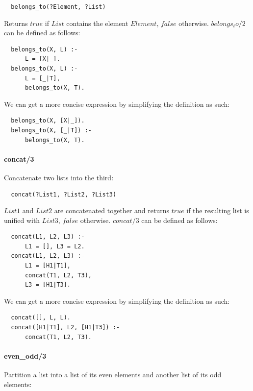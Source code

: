\documentclass{article}
\begin{document}
\begin{multicols}{2}
  \begin{lstlisting}
  belongs_to(?Element, ?List)
  \end{lstlisting} 
  
  Returns $true$ if $List$ contains the element $Element$, $false$ otherwise. $belongs_to/2$ can be defined as follows:

  \begin{lstlisting}
  belongs_to(X, L) :-
      L = [X|_].
  belongs_to(X, L) :-
      L = [_|T],
      belongs_to(X, T).
  \end{lstlisting} 
  
  We can get a more concise expression by simplifying the definition as such:

  \begin{lstlisting}
  belongs_to(X, [X|_]).
  belongs_to(X, [_|T]) :-
      belongs_to(X, T).
  \end{lstlisting} 
  
  \paragraph{concat/3} Concatenate two lists into the third:
  
  \begin{lstlisting}
  concat(?List1, ?List2, ?List3)
  \end{lstlisting} 
  
  $List1$ and $List2$ are concatenated together and returns $true$ if the resulting list is unified with $List3$, $false$ otherwise. $concat/3$ can be defined as follows:

  \begin{lstlisting}
  concat(L1, L2, L3) :-
      L1 = [], L3 = L2.
  concat(L1, L2, L3) :- 
      L1 = [H1|T1],
      concat(T1, L2, T3),
      L3 = [H1|T3].
  \end{lstlisting} 
  
  We can get a more concise expression by simplifying the definition as such:

  \begin{lstlisting}
  concat([], L, L).
  concat([H1|T1], L2, [H1|T3]) :- 
      concat(T1, L2, T3).
  \end{lstlisting}
  
  \paragraph{even\_odd/3} Partition a list into a list of its even elements and another list of its odd elements:
  

\end{multicols}
\end{document}
